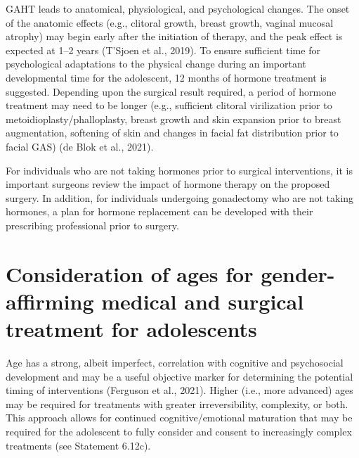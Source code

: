 \documentclass[
]{book}
\begin{document}
GAHT leads to anatomical, physiological, and
psychological changes. The onset of the anatomic
effects (e.g., clitoral growth, breast growth, vaginal mucosal atrophy) may begin early after the
initiation of therapy, and the peak effect is
expected at 1--2 years (T'Sjoen et al., 2019). To
ensure sufficient time for psychological adaptations to the physical change during an important
developmental time for the adolescent, 12 months
of hormone treatment is suggested. Depending
upon the surgical result required, a period of
hormone treatment may need to be longer (e.g.,
sufficient clitoral virilization prior to metoidioplasty/phalloplasty, breast growth and skin expansion prior to breast augmentation, softening of
skin and changes in facial fat distribution prior
to facial GAS) (de Blok et al., 2021).

For individuals who are not taking hormones
prior to surgical interventions, it is important
surgeons review the impact of hormone therapy
on the proposed surgery. In addition, for individuals undergoing gonadectomy who are not
taking hormones, a plan for hormone replacement can be developed with their prescribing
professional prior to surgery.

\hypertarget{consideration-of-ages-for-gender-affirming-medical-and-surgical-treatment-for-adolescents}{%
\section*{Consideration of ages for gender-affirming medical and surgical treatment for adolescents}\label{consideration-of-ages-for-gender-affirming-medical-and-surgical-treatment-for-adolescents}}

Age has a strong, albeit imperfect, correlation
with cognitive and psychosocial development and
may be a useful objective marker for determining
the potential timing of interventions (Ferguson
et al., 2021). Higher (i.e., more advanced) ages
may be required for treatments with greater irreversibility, complexity, or both. This approach
allows for continued cognitive/emotional maturation that may be required for the adolescent
to fully consider and consent to increasingly complex treatments (see Statement 6.12c).
\end{document}

